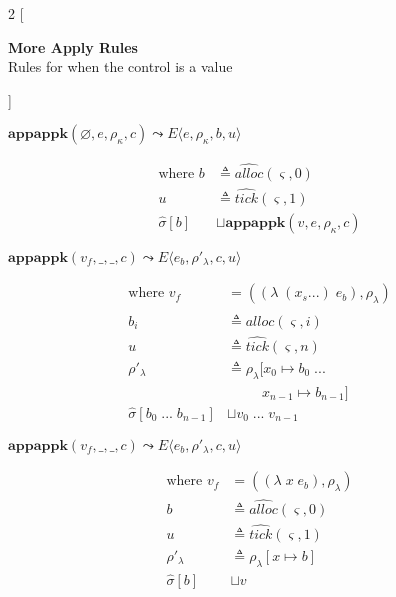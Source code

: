 \documentclass[12pt,draft]{article}
\newcommand{\lamsyn}[2]{(\lambda\;(#1 ...)\;#2)}
\newcommand{\vararglamsyn}[2]{(\lambda\;#1\;#2)}
\begin{document}
\begin{multicols*}{2}
[
\begin{center}
\textbf{More Apply Rules} \\
Rules for when the control is a value
\end{center}
]
\begin{center}
  $\textbf{appappk}(\varnothing, e, \rho_\kappa, c)
  \leadsto E\langle e , \rho_\kappa , b , u \rangle$
\end{center}
\vspace{-7mm}
\begin{align*}
\text{where } b &\triangleq \widehat{alloc}(\varsigma, 0) \\
u &\triangleq \widehat{tick}(\varsigma, 1) \\
\hat{\sigma}[b] &\sqcup \textbf{appappk}(v, e, \rho_{\kappa}, c)
\end{align*}
\begin{center}
  $\textbf{appappk}(v_f, \_, \_, c)
  \leadsto E\langle e_b , \rho'_\lambda , c , u \rangle$
\end{center}
\vspace{-7mm}
\begin{align*}
\text{where } v_f &= (\lamsyn{x_s}{e_b}, \rho_{\lambda}) \\
b_i &\triangleq \widehat{alloc}(\varsigma, i) \\
u &\triangleq \widehat{tick}(\varsigma, n) \\
\rho'_{\lambda} &\triangleq \rho_{\lambda}[x_0 \mapsto b_0\; ... \\
&\;\;\;\;\;\;\;\;\;x_{n-1} \mapsto b_{n-1}] \\
\hat{\sigma}[b_0\;...\; b_{n-1}] &\sqcup v_0\;...\;v_{n-1}
\end{align*}
\begin{center}
  $\textbf{appappk}(v_f, \_, \_, c)
  \leadsto E\langle e_b , \rho'_\lambda , c , u \rangle$
\end{center}
\vspace{-7mm}
\begin{align*}
\text{where } v_f &= (\vararglamsyn{x}{e_b}, \rho_{\lambda}) \\
b &\triangleq \widehat{alloc}(\varsigma, 0) \\
u &\triangleq \widehat{tick}(\varsigma, 1) \\
\rho'_{\lambda} &\triangleq \rho_{\lambda}[x \mapsto b] \\
\hat{\sigma}[b] &\sqcup v
\end{align*}


\end{multicols*}
\end{document}
